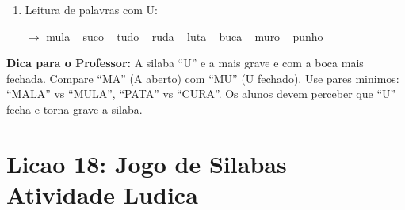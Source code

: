 \begin{exercicio}
\begin{enumerate}[resume]
  \item Leitura de palavras com U:
  \begin{center}
  $\rightarrow$ mula  ~  suco  ~  tudo  ~  ruda  ~  luta  ~  buca  ~  muro  ~  punho
  \end{center}
\end{enumerate}
\end{exercicio}

\begin{dica}
\textbf{Dica para o Professor:} A silaba ``U'' e a mais grave e com a boca mais fechada. Compare ``MA'' (A aberto) com ``MU'' (U fechado). Use pares minimos: ``MALA'' vs ``MULA'', ``PATA'' vs ``CURA''. Os alunos devem perceber que ``U'' fecha e torna grave a silaba.
\end{dica}

\section{Licao 18: Jogo de Silabas --- Atividade Ludica}

\rotinasimples
{}



